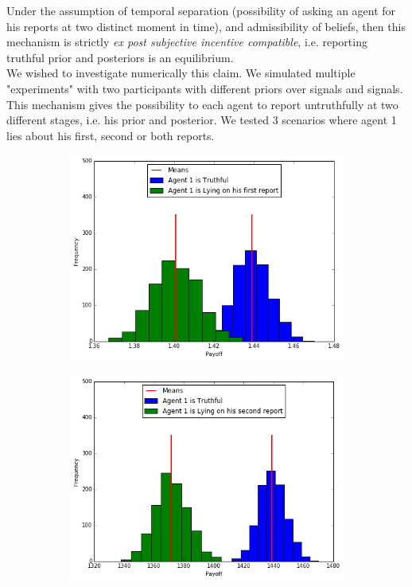 \documentclass{scrartcl}
\begin{document}
Under the assumption of temporal separation (possibility of asking an agent for his reports at two distinct moment in time), and admissibility of beliefs, then this mechanism is strictly \emph{ex post subjective incentive compatible}, i.e. reporting truthful prior and posteriors is an equilibrium.\\

We wished to investigate numerically this claim. We simulated multiple "experiments" with two participants with different priors over signals and signals. This mechanism gives the possibility to each agent to report untruthfully at two different stages, i.e. his prior and posterior. We tested 3 scenarios where agent 1 lies about his first, second or both reports.

\begin{figure}[H]
\caption{Private-Prior PP}
\begin{subfigure}{0.4\textwidth}
\includegraphics[scale=0.4]{images/pp_first}
\end{subfigure}
\hspace{0.1\textwidth}
\begin{subfigure}{0.4\textwidth}
\includegraphics[scale=0.4]{images/pp_second}
\end{subfigure}
\end{figure}
\end{document}
